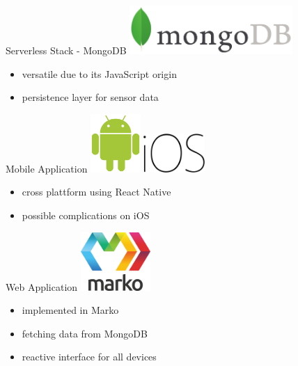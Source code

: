 \documentclass[aspectratio=1610]{beamer}
\begin{document}
  \begin{frame}{Serverless Stack - MongoDB}
    \includegraphics[height=5em]{mongodb-logo}

    \vspace*{1.5em}

    \begin{itemize}
      \item versatile due to its JavaScript origin
      \item persistence layer for sensor data
    \end{itemize}
  \end{frame}

  \begin{frame}{Mobile Application}
    \includegraphics[align=c,height=6em]{android-logo}
    \hspace*{2em}
    \includegraphics[align=c,height=4em]{ios-logo}

    \vspace*{2em}

    \begin{itemize}
      \item cross plattform using React Native
      \item possible complications on iOS
    \end{itemize}
  \end{frame}

  \begin{frame}{Web Application}
    \includegraphics[height=6em]{marko-logo}

    \vspace*{2em}

    \begin{itemize}
      \item implemented in Marko
      \item fetching data from MongoDB
      \item reactive interface for all devices
    \end{itemize}
  \end{frame}
\end{document}
